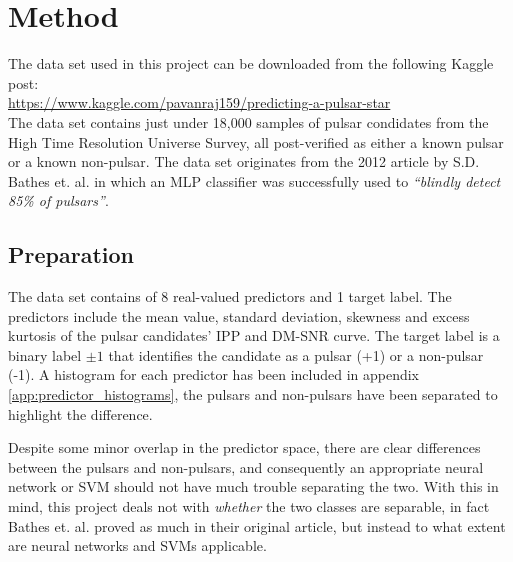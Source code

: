 \documentclass[nofootinbib,reprint,english]{revtex4-1}
\begin{document}
%
\clearpage
\section{Method}
The data set used in this project can be downloaded from the following Kaggle post:\\
{\scriptsize\url{https://www.kaggle.com/pavanraj159/predicting-a-pulsar-star}}\\
The data set contains just under 18,000 samples of pulsar condidates from the High Time Resolution Universe Survey, all post-verified as either a known pulsar or a known non-pulsar. The data set originates from the 2012 article \cite{HTRUS} by S.D. Bathes et. al. in which an MLP classifier was successfully used to \emph{``blindly detect 85\% of pulsars''}.
\subsection{Preparation}
The data set contains of 8 real-valued predictors and 1 target label. The predictors include the mean value, standard deviation, skewness and excess kurtosis of the pulsar candidates' IPP and DM-SNR curve. The target label is a binary label \(\pm1\) that identifies the candidate as a pulsar (+1) or a non-pulsar (-1).  A histogram for each predictor has been included in appendix \ref{app:predictor_histograms}, the pulsars and non-pulsars have been separated to highlight the difference.

Despite some minor overlap in the predictor space, there are clear differences between the pulsars and non-pulsars, and consequently an appropriate neural network or SVM should not have much trouble separating the two. With this in mind, this project deals not with \emph{whether} the two classes are separable, in fact Bathes et. al. proved as much in their original article, but instead to what extent are neural networks and SVMs applicable.
\end{document}
